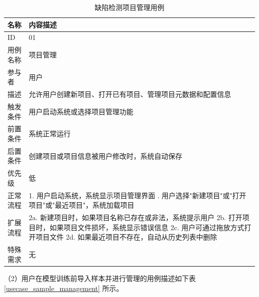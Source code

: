 \documentclass[
  ]{njuthesis}
\begin{document}
\begin{table}[H]
    \centering
    \caption{缺陷检测项目管理用例}
    \label{usecase_project_management}
    \renewcommand\arraystretch{0.5}
    \begin{tabular}{p{2.5cm}p{11cm}}
    \toprule[1.5pt]
    名称 & 内容描述 \\
    \midrule[1pt]
    ID & 01 \\
    \midrule[0.5pt]
    用例名称 & 项目管理 \\
    \midrule[0.5pt]
    参与者 & 用户 \\
    \midrule[0.5pt]
    描述 & 允许用户创建新项目、打开已有项目、管理项目元数据和配置信息 \\
    \midrule[0.5pt]
    触发条件 & 用户启动系统或选择项目管理功能 \\
    \midrule[0.5pt]
    前置条件 & 系统正常运行 \\
    \midrule[0.5pt]
    后置条件 & 创建项目或项目信息被用户修改时，系统自动保存 \\
    \midrule[0.5pt]
    优先级 & 低 \\
    \midrule[0.5pt]
    正常流程 & 1. 用户启动系统，系统显示项目管理界面 \newline
    2. 用户选择"新建项目"或"打开项目"或"最近项目"，系统加载项目 \\
    \midrule[0.5pt]
    扩展流程 & 2a. 新建项目时，如果项目名称已存在或非法，系统提示用户 \newline
    2b. 打开项目时，如果项目文件损坏，系统显示错误信息 \newline
    2c. 用户可通过拖放方式打开项目文件 \newline
    2d. 如果最近项目不存在，自动从历史列表中删除 \\
    \midrule[0.5pt]
    特殊需求 & 无 \\
    \bottomrule[1.5pt]
    \end{tabular}
\end{table}

（2）用户在模型训练前导入样本并进行管理的用例描述如下表 \ref{usecase_sample_management} 所示。
\end{document}
